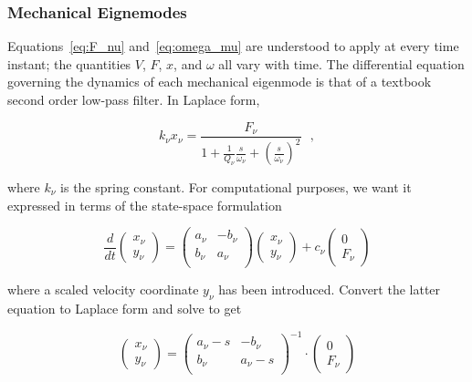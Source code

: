 \documentclass[a4paper,12pt]{article}
\begin{document}
\subsubsection{Mechanical Eignemodes}

Equations~\ref{eq:F_nu} and~\ref{eq:omega_mu} are understood to apply at every time instant; the quantities $V$, $F$, $x$, and $\omega$ all vary with time. The differential equation governing the dynamics of each mechanical eigenmode is that of a textbook second order low-pass filter.  In Laplace form,

\begin{equation}
k_\nu x_\nu = \frac{F_\nu}{ \displaystyle 1 + \frac{1}{Q_\nu}\frac{s}{\omega_\nu} + \left(\frac{s}{\omega_\nu}\right)^2}~~~,
\end{equation}

\noindent where $k_\nu$ is the spring constant. For computational purposes, we want it expressed in terms of the state-space formulation

\begin{equation}
\frac{d}{dt} \begin{pmatrix}
              x_{\nu} \\
              y_{\nu}
             \end{pmatrix}
             = \begin{pmatrix}
                a_{\nu} & -b_{\nu} \\
                b_{\nu} & a_{\nu} \\
               \end{pmatrix}
               \begin{pmatrix}
                x_{\nu}\\
                y_{\nu}
               \end{pmatrix}
               +c_{\nu} \begin{pmatrix}
                  0 \\
                  F_{\nu}
                 \end{pmatrix}
\label{eq: state_space}
\end{equation}

\noindent where a scaled velocity coordinate $y_{\nu}$ has been introduced. Convert the latter equation to Laplace form and solve to get

\begin{equation}
  \begin{pmatrix}
    x_{\nu} \\
    y_{\nu}
  \end{pmatrix}
  = 
  \begin{pmatrix}
    a_{\nu}-s& -b_{\nu} \\
    b_{\nu} & a_{\nu}-s \\
   \end{pmatrix}^{-1}
   \cdot
   \begin{pmatrix}
     0 \\
     F_{\nu}
  \end{pmatrix}
\end{equation}
\end{document}
